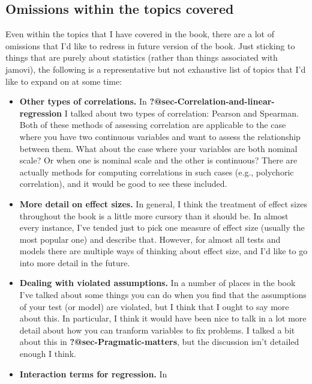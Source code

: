 \documentclass[
  a4paper,
]{book}
\begin{document}
\hypertarget{omissions-within-the-topics-covered}{%
\subsection*{Omissions within the topics
covered}\label{omissions-within-the-topics-covered}}

Even within the topics that I have covered in the book, there are a lot
of omissions that I'd like to redress in future version of the book.
Just sticking to things that are purely about statistics (rather than
things associated with jamovi), the following is a representative but
not exhaustive list of topics that I'd like to expand on at some time:

\begin{itemize}
\item
  \textbf{Other types of correlations.} In
  \textbf{?@sec-Correlation-and-linear-regression} I talked about two
  types of correlation: Pearson and Spearman. Both of these methods of
  assessing correlation are applicable to the case where you have two
  continuous variables and want to assess the relationship between them.
  What about the case where your variables are both nominal scale? Or
  when one is nominal scale and the other is continuous? There are
  actually methods for computing correlations in such cases (e.g.,
  polychoric correlation), and it would be good to see these included.
\item
  \textbf{More detail on effect sizes.} In general, I think the
  treatment of effect sizes throughout the book is a little more cursory
  than it should be. In almost every instance, I've tended just to pick
  one measure of effect size (usually the most popular one) and describe
  that. However, for almost all tests and models there are multiple ways
  of thinking about effect size, and I'd like to go into more detail in
  the future.
\item
  \textbf{Dealing with violated assumptions.} In a number of places in
  the book I've talked about some things you can do when you find that
  the assumptions of your test (or model) are violated, but I think that
  I ought to say more about this. In particular, I think it would have
  been nice to talk in a lot more detail about how you can tranform
  variables to fix problems. I talked a bit about this in
  \textbf{?@sec-Pragmatic-matters}, but the discussion isn't detailed
  enough I think.
\item
  \textbf{Interaction terms for regression.} In

\end{itemize}
\end{document}
